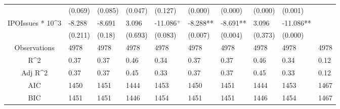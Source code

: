 \documentclass{article}
\begin{document}
\begin{table}[H]
\begin{tabular}{|clllllllll|}
   & (0.069) & (0.085) & (0.047) & (0.127) & (0.000) & (0.000) & (0.000) & (0.001) &  \\ 
  IPOIssues * 10^3 & -8.288 & -8.691 & 3.096 & -11.086$^{+}$ & -8.288** & -8.691** & 3.096 & -11.086** &  \\ 
   & (0.211) & (0.18) & (0.693) & (0.083) & (0.007) & (0.004) & (0.373) & (0.000) &  \\ 
  \hline 
 Observations & 4978 & 4978 & 4978 & 4978 & 4978 & 4978 & 4978 & 4978 & 4978 \\ 
  R^2 & 0.37 & 0.37 & 0.46 & 0.34 & 0.37 & 0.37 & 0.46 & 0.34 & 0.12 \\ 
  Adj R^2 & 0.37 & 0.37 & 0.45 & 0.33 & 0.37 & 0.37 & 0.45 & 0.33 & 0.12 \\ 
  AIC & 1450 & 1451 & 1444 & 1453 & 1450 & 1451 & 1444 & 1453 & 1467 \\ 
  BIC & 1451 & 1451 & 1446 & 1454 & 1451 & 1451 & 1446 & 1454 & 1467 \\ 
   \hline
\end{tabular}
 
\end{table}
\end{document}
